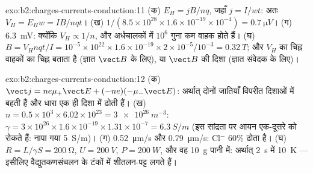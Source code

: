 \begin{solution}{exo:b2:charges-currents-conduction:11}
(क) $E_H = jB/nq$, जहाँ $j = I/wt$: अतः $V_H = E_Hw = IB/nqt$। (ख) $1/(8.5 \times 10^{28}
\times 1.6 \times 10^{-19} \times 10^{-4}) = \qty{0.7}{\micro V}$। (ग) \qty{6.3}{mV}: क्योंकि $V_H \propto 1/n$,
और अर्धचालकों में $10^6$ गुना कम वाहक होते हैं। (घ) $B = V_Hnqt/I =
10^{-5} \times 10^{22} \times 1.6 \times 10^{-19} \times 2 \times 10^{-5}/10^{-3} = \qty{0.32}{T}$; और $V_H$ का
चिह्न वाहकों का चिह्न बताता है (ज्ञात $\vect B$ के लिए), या
$\vect B$ की दिशा (ज्ञात संवेदक के लिए)।
\end{solution}

\begin{solution}{exo:b2:charges-currents-conduction:12}
(क) $\vect j = ne\mu_+\vect E + (-ne)(-\mu_-\vect E)$: अर्थात् दोनों जातियाँ
विपरीत दिशाओं में बहती हैं और धारा एक ही दिशा में ढोती हैं। (ख) $n =
0.5 \times 10^3 \times 6.02 \times 10^{23} = \qty{3e26}{m^{-3}}$: $\gamma = 3 \times 10^{26} \times 1.6 \times 10^{-19}
\times 1.31 \times 10^{-7} = \qty{6.3}{S/m}$ (इस सांद्रता पर आयन एक-दूसरे को रोकते हैं:
नापा गया \qty{5}{S/m})। (ग) \qty{0.52}{\micro m/s} और \qty{0.79}{\micro m/s}:
Cl$^-$ $60\%$ ढोता है। (घ) $R = L/\gamma S = \qty{200}{\ohm}$, $U = \qty{200}{V}$, $P =
\qty{200}{W}$, और वह \qty{10}{g} पानी में: अर्थात् \qty{2}{s} में \qty{10}{K} --- इसीलिए वैद्युतकणसंचलन
के टंकों में शीतलन-पट्ट लगते हैं।
\end{solution}

